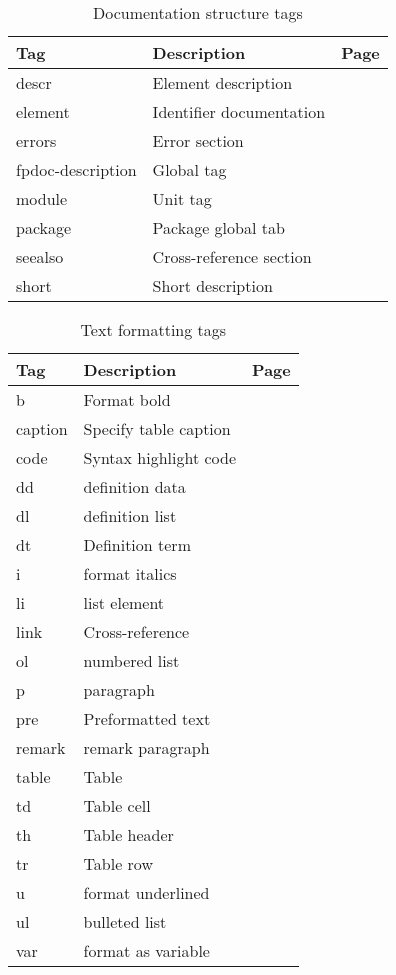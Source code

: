 \begin{table}[ht]
\caption{Documentation structure tags}\label{tab:structtags}
\begin{tabularx}{\textwidth}{lXr}
Tag & Description & Page \\ \hline
descr & Element description & \pageref{tag:descr} \\
element & Identifier documentation & \pageref{tag:element} \\
errors  & Error section & \pageref{tag:errors} \\
fpdoc-description & Global tag & \pageref{tag:fpdocdescription} \\
module & Unit tag & \pageref{tag:module} \\
package & Package global tab & \pageref{tag:package} \\
seealso & Cross-reference section & \pageref{tag:seealso} \\
short & Short description & \pageref{tag:short} \\ \hline
\end{tabularx}
\end{table}

\begin{table}[ht]
\caption{Text formatting tags}\label{tab:formattags}
\begin{tabularx}{\textwidth}{lXr}
Tag & Description & Page \\ \hline
b & Format bold & \pageref{tag:b} \\
caption & Specify table caption & \pageref{tag:caption} \\
code & Syntax highlight code & \pageref{tag:code} \\
dd & definition data & \pageref{tag:dd} \\
dl & definition list & \pageref{tag:dl} \\
dt & Definition term & \pageref{tag:dt} \\
i & format italics & \pageref{tag:i} \\
li & list element & \pageref{tag:li} \\
link & Cross-reference & \pageref{tag:link} \\
ol & numbered list & \pageref{tag:ol} \\
p & paragraph & \pageref{tag:p} \\
pre & Preformatted text & \pageref{tag:pre} \\
remark & remark paragraph & \pageref{tag:remark} \\
table & Table & \pageref{tag:table} \\
td & Table cell & \pageref{tag:td} \\
th & Table header & \pageref{tag:th} \\
tr & Table row & \pageref{tag:tr} \\
u & format underlined & \pageref{tag:u} \\
ul & bulleted list & \pageref{tag:ul} \\
var & format as variable & \pageref{tag:var} \\ \hline
\end{tabularx}
\end{table}

